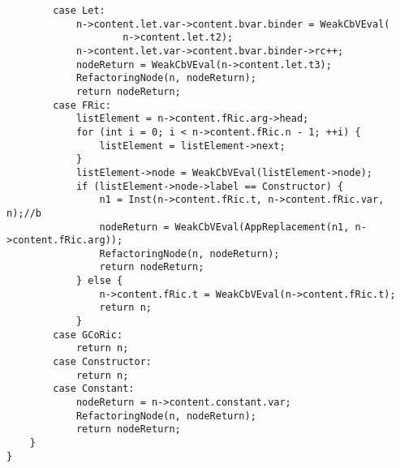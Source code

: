 \documentclass[12pt,a4paper,openright,twoside]{report}
\begin{document}
\begin{verbatim}
        case Let:
            n->content.let.var->content.bvar.binder = WeakCbVEval(
                    n->content.let.t2);
            n->content.let.var->content.bvar.binder->rc++;
            nodeReturn = WeakCbVEval(n->content.let.t3);
            RefactoringNode(n, nodeReturn);
            return nodeReturn;
        case FRic:
            listElement = n->content.fRic.arg->head;
            for (int i = 0; i < n->content.fRic.n - 1; ++i) {
                listElement = listElement->next;
            }
            listElement->node = WeakCbVEval(listElement->node);
            if (listElement->node->label == Constructor) {
                n1 = Inst(n->content.fRic.t, n->content.fRic.var, n);//b
                nodeReturn = WeakCbVEval(AppReplacement(n1, n->content.fRic.arg));
                RefactoringNode(n, nodeReturn);
                return nodeReturn;
            } else {
                n->content.fRic.t = WeakCbVEval(n->content.fRic.t);
                return n;
            }
        case GCoRic:
            return n;
        case Constructor:
            return n;
        case Constant:
            nodeReturn = n->content.constant.var;
            RefactoringNode(n, nodeReturn);
            return nodeReturn;
    }
}


\end{verbatim}
\end{document}
